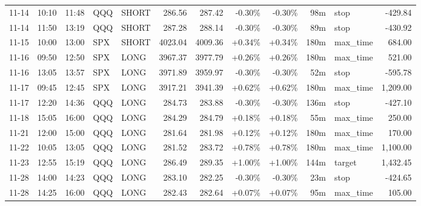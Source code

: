 \documentclass[11pt,a4paper]{article}
\begin{document}
\begin{center}
\begin{longtable}{>{\color{txtmain}}l l l l l r r r r r >{\color{txtmain}}l r}
11-14 & 10:10 & 11:48 & QQQ & SHORT & 286.56 & 287.42 & \textcolor{lossred}{-0.30\%} & \textcolor{lossred}{-0.30\%} & 98m & stop & \textcolor{lossred}{-429.84} \\
11-14 & 11:50 & 13:19 & QQQ & SHORT & 287.28 & 288.14 & \textcolor{lossred}{-0.30\%} & \textcolor{lossred}{-0.30\%} & 89m & stop & \textcolor{lossred}{-430.92} \\
11-15 & 10:00 & 13:00 & SPX & SHORT & 4023.04 & 4009.36 & \textcolor{wingreen}{+0.34\%} & \textcolor{wingreen}{+0.34\%} & 180m & max\_time & \textcolor{wingreen}{684.00} \\
11-16 & 09:50 & 12:50 & SPX & LONG & 3967.37 & 3977.79 & \textcolor{wingreen}{+0.26\%} & \textcolor{wingreen}{+0.26\%} & 180m & max\_time & \textcolor{wingreen}{521.00} \\
11-16 & 13:05 & 13:57 & SPX & LONG & 3971.89 & 3959.97 & \textcolor{lossred}{-0.30\%} & \textcolor{lossred}{-0.30\%} & 52m & stop & \textcolor{lossred}{-595.78} \\
11-17 & 09:45 & 12:45 & SPX & LONG & 3917.21 & 3941.39 & \textcolor{wingreen}{+0.62\%} & \textcolor{wingreen}{+0.62\%} & 180m & max\_time & \textcolor{wingreen}{1,209.00} \\
11-17 & 12:20 & 14:36 & QQQ & LONG & 284.73 & 283.88 & \textcolor{lossred}{-0.30\%} & \textcolor{lossred}{-0.30\%} & 136m & stop & \textcolor{lossred}{-427.10} \\
11-18 & 15:05 & 16:00 & QQQ & LONG & 284.29 & 284.79 & \textcolor{wingreen}{+0.18\%} & \textcolor{wingreen}{+0.18\%} & 55m & max\_time & \textcolor{wingreen}{250.00} \\
11-21 & 12:00 & 15:00 & QQQ & LONG & 281.64 & 281.98 & \textcolor{wingreen}{+0.12\%} & \textcolor{wingreen}{+0.12\%} & 180m & max\_time & \textcolor{wingreen}{170.00} \\
11-22 & 10:05 & 13:05 & QQQ & LONG & 281.52 & 283.72 & \textcolor{wingreen}{+0.78\%} & \textcolor{wingreen}{+0.78\%} & 180m & max\_time & \textcolor{wingreen}{1,100.00} \\
11-23 & 12:55 & 15:19 & QQQ & LONG & 286.49 & 289.35 & \textcolor{wingreen}{+1.00\%} & \textcolor{wingreen}{+1.00\%} & 144m & target & \textcolor{wingreen}{1,432.45} \\
11-28 & 14:00 & 14:23 & QQQ & LONG & 283.10 & 282.25 & \textcolor{lossred}{-0.30\%} & \textcolor{lossred}{-0.30\%} & 23m & stop & \textcolor{lossred}{-424.65} \\
11-28 & 14:25 & 16:00 & QQQ & LONG & 282.43 & 282.64 & \textcolor{wingreen}{+0.07\%} & \textcolor{wingreen}{+0.07\%} & 95m & max\_time & \textcolor{wingreen}{105.00} \\

\end{longtable}
\end{center}
\end{document}
